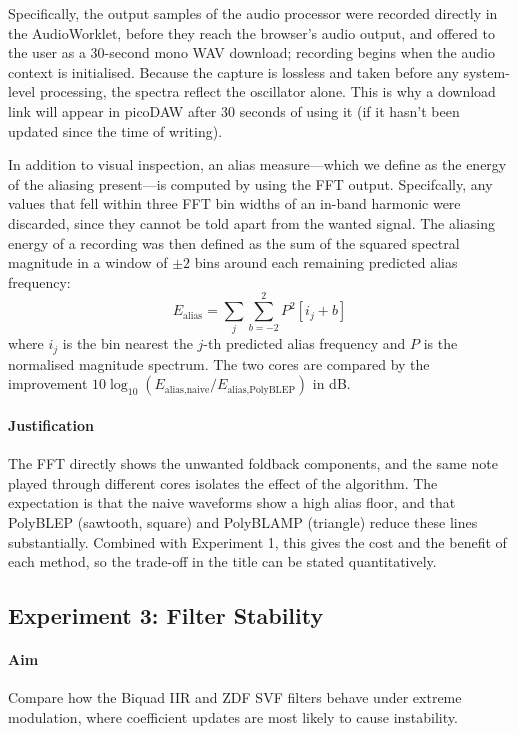Specifically, the output samples of the audio processor were recorded directly in
the AudioWorklet, before they reach the browser's audio output, and
offered to the user as a 30-second mono WAV download; recording begins
when the audio context is initialised. Because the capture is lossless
and taken before any system-level processing, the spectra reflect
the oscillator alone. This is why a download link will appear in picoDAW after 30 seconds of using it (if it hasn't been updated since the time of writing).

In addition to visual inspection, an alias measure---which we define as the energy of the aliasing present---is computed by using the FFT output. Specifcally, any values that fell within three FFT
bin widths of an in-band harmonic were discarded, since they cannot be
told apart from the wanted signal. The aliasing energy of a recording
was then defined as the sum of the squared spectral magnitude in a
window of $\pm 2$ bins around each remaining predicted alias frequency:
\begin{equation}
  E_{\text{alias}} = \sum_{j} \sum_{b=-2}^{2} P^2\!\left[ i_j + b \right]
\end{equation}
where $i_j$ is the bin nearest the $j$-th predicted alias frequency and
$P$ is the normalised magnitude spectrum. The two cores are compared by
the improvement
$10\log_{10}\!\left(E_{\text{alias,naive}} / E_{\text{alias,PolyBLEP}}\right)$
in dB.

\paragraph{Justification} The FFT directly shows the unwanted foldback components, and the same note played through different cores isolates the effect of the algorithm. The expectation is that the naive waveforms show a high alias floor, and that PolyBLEP (sawtooth, square) and PolyBLAMP (triangle) reduce these lines substantially. Combined with Experiment 1, this gives the cost and the benefit of each method, so the trade-off in the title can be stated quantitatively.

\subsection{Experiment 3: Filter Stability}
\label{sec:stability}
\noindent
\paragraph{Aim} Compare how the Biquad IIR and ZDF SVF filters behave
under extreme modulation, where coefficient updates are most likely to
cause instability.

